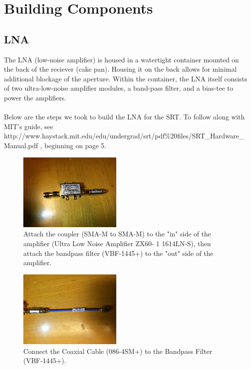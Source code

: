 \documentclass[11pt]{article} %
\begin{document}
\newpage
\section{Building Components}


\subsection{LNA}

The LNA (low-noise amplifier) is housed in a watertight container mounted on the back of the reciever (cake pan). Housing it on the back allows for minimal additional blockage of the aperture. Within the container, the LNA itself consists of two ultra-low-noise amplifier modules, a band-pass filter, and a bias-tee to power the amplifiers.
\\ \\
Below are the steps we took to build the LNA for the SRT. To follow along with MIT's guide, see http://www.haystack.mit.edu/edu/undergrad/srt/pdf\%20files/SRT\_Hardware\_Manual.pdf , beginning on page 5.

\vspace{1cm}

\begin{figure}
  \centering
  \caption{Attach the coupler (SMA-M to SMA-M) to the "in" side of the amplifier (Ultra Low Noise Amplifier ZX60- 1 1614LN-S),  then attach the bandpass filter (VBF-1445+) to the "out" side of the amplifier. }
  \includegraphics[width=0.45\textwidth]{lna/01.jpeg}
\end{figure}


\begin{figure}
  \centering
  \caption{Connect the Coaxial Cable (086-4SM+) to the Bandpass Filter (VBF-1445+). }
  \includegraphics[width=0.45\textwidth]{lna/02.jpeg}
\end{figure}
\end{document}
